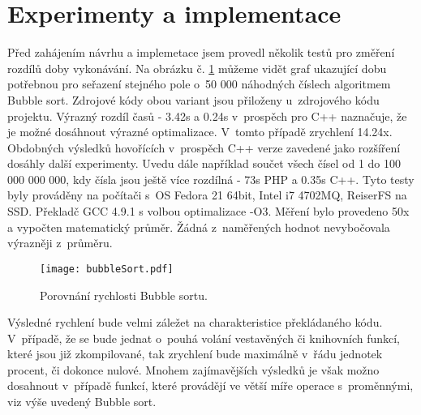 \documentclass[czech]{ExcelAtFIT}
\begin{document}






\section{Experimenty a implementace}

	Před zahájením návrhu a implemetace jsem provedl několik testů pro změření rozdílů doby vykonávání. Na obrázku č. \ref{fig:bubbleSort} můžeme vidět graf ukazující dobu potřebnou pro seřazení stejného pole o~50 000 ná\-hod\-ných číslech algoritmem Bubble sort. Zdrojové kódy obou variant jsou přiloženy u~zdrojového kódu projektu. Výrazný rozdíl časů - 3.42s a 0.24s v~prospěch pro C++ naznačuje, že je možné dosáhnout výrazné optimalizace. V~tomto případě zrychlení 14.24x. Obdobných výsledků hovořících v~prospěch C++ verze zavedené jako rozšíření dosáhly další experimenty. U\-ve\-du dále například součet všech čísel od 1 do 100 000 000 000, kdy čísla jsou ještě více rozdílná - 73s PHP a 0.35s C++. Tyto testy byly prováděny na počítači s~OS Fedora 21 64bit, Intel i7 4702MQ, ReiserFS na SSD. Překladč GCC 4.9.1 s volbou optimalizace -O3. Měření bylo provedeno 50x a vypočten matematický průměr. Žádná z~naměřených hodnot nevybočovala výrazněji z~prů\-mě\-ru.


\begin{figure}[t]
	\centering
	\texttt{[image: bubbleSort.pdf]}
	\caption{Porovnání rychlosti Bubble sortu.}
	\label{fig:bubbleSort}
\end{figure}

	Výsledné rychlení bude velmi záležet na charakteristice překládaného kódu. V~případě, že se bude jednat o~pouhá volání vestavěných či knihovních funkcí, které jsou již zkompilované, tak zrychlení bude ma\-xi\-mál\-ně v~řádu jednotek procent, či dokonce nulové. Mnohem zajímavějších výsledků je však možno dosahnout v~případě funkcí, které provádějí ve větší míře operace s~proměnnými, viz výše uvedený Bubble sort.
\end{document}
